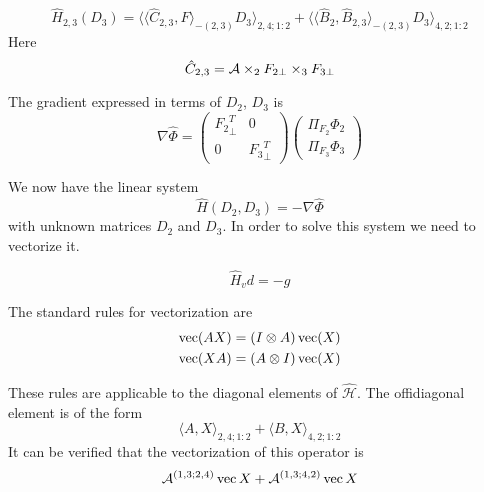 \begin{equation}
\hat{{H}}_{2,3}(D{_3}) = \langle \langle \hat{C}_{2,3}, F \rangle_{-(2,3)} D{_3} \rangle_{2,4;1:2} + \langle \langle \hat{B}_{2}, \hat{B}_{2,3} \rangle_{-(2,3)} D{_3} \rangle_{4,2;1:2}
\end{equation}
Here
\begin{equation}
    \hat{C}_{2,3} = \mathcal{A} \times_2 F_{2 \bot} \times_3 F_{3 \bot}
\end{equation}

The gradient expressed in terms of $D_2$, $D_3$ is
\begin{equation}
\nabla \hat{\Phi} = \begin{pmatrix}
{F_2}_{\bot}^T & 0 \\
0 & {F_3}^T_{\bot} 
\end{pmatrix} \begin{pmatrix}
\Pi_{{F_2}}\Phi{_2} \\
\Pi_{F_3} \Phi{_3}
\end{pmatrix}
\end{equation}




We now have the linear system 
\begin{equation}
\hat{{H}}(D{_2}, D{_3}) = -\nabla \hat{\Phi}
\end{equation}
with unknown matrices $D{_2}$ and $D{_3}$. In order to solve this system
we need to vectorize it.



\begin{equation}
    \label{ng_system_fin}
    \hat{H}_{v} d = - g
\end{equation}



The standard rules for vectorization are
\begin{eqnarray*}
\operatorname*{vec}(AX) = (I \otimes A) \operatorname*{vec}(X) \\
\operatorname*{vec}(XA) = (A \otimes I) \operatorname*{vec}(X)
\end{eqnarray*}

These rules are applicable to the diagonal elements of $\hat{\mathcal{H}}$. The offidiagonal element
is of the form
\begin{equation}
\langle A, X \rangle _{2,4;1:2} + \langle B, X \rangle_{4,2;1:2}
\end{equation}
It can be verified that the vectorization of this operator is
\begin{equation}
\mathcal{A}^{(1,3;2,4)} \operatorname*{vec}{X} + \mathcal{A}^{(1,3;4,2)} \operatorname*{vec}{X}
\end{equation}



